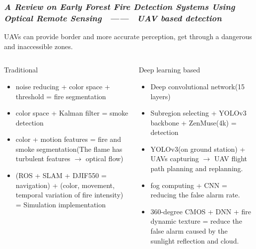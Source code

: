 \begin{frame}
    \frametitle{\textit{A Review on Early Forest Fire Detection Systems
Using Optical Remote Sensing ~------~ UAV based detection}}

UAVs can provide border and more accurate perception, get through a dangerous
and inaccessible zones.

\begin{columns}[t]
    \begin{block}{Traditional}
        \begin{itemize}
            \item noise reducing + color space + threshold = fire segmentation
            \item color space + Kalman filter = smoke detection
            \item color + motion features = fire and smoke segmentation(The
                flame has turbulent features $\rightarrow$ optical flow)
            \item (ROS + SLAM + DJIF550 = navigation) + (color, movement,
                temporal variation of fire intensity) = Simulation implementation
        \end{itemize}
    \end{block}

    \begin{block}{Deep learning based}
        \begin{itemize}
            \item Deep convolutional network(15 layers)
            \item Subregion selecting + YOLOv3 backbone + ZenMuse(4k) =
                detection
            \item YOLOv3(on ground station) + UAVs capturing $\rightarrow$ UAV
                flight path planning and replanning.
            \item fog computing + CNN = reducing the false alarm rate.
            \item 360-degree CMOS + DNN + fire dynamic texture = reduce the
                false alarm caused by the sunlight reflection and
                cloud.\footnotemark[1]

        \end{itemize}
    \end{block}

\end{columns}
\end{frame}
